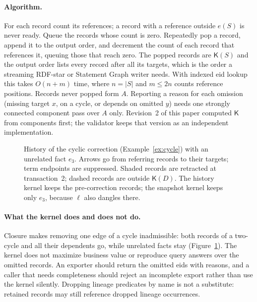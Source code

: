 \documentclass[11pt]{article}
\theoremstyle{plain}
\theoremstyle{definition}
\theoremstyle{remark}
\newcommand{\Kernel}{\mathsf{K}}
\begin{document}
\paragraph{Algorithm.}
For each record count its references; a record with a reference outside $e(S)$ is
never ready. Queue the records whose count is zero. Repeatedly pop a record, append
it to the output order, and decrement the count of each record that references it,
queuing those that reach zero. The popped records are $\Kernel(S)$ and the output
order lists every record after all its targets, which is the order a streaming
RDF-star or Statement Graph writer needs. With indexed eid lookup this takes
$O(n+m)$ time, where $n=|S|$ and $m\le2n$ counts reference positions. Records never
popped form $A$. Reporting a reason for each omission (missing target $x$, on a
cycle, or depends on omitted $y$) needs one strongly connected component pass over
$A$ only. Revision~2 of this paper computed $\Kernel$ from components first; the
validator keeps that version as an independent implementation.

\begin{figure}[t]
\centering
{}
\caption{History of the cyclic correction (Example~\ref{ex:cycle}) with an
unrelated fact $e_3$. Arrows go from referring records to their targets; term
endpoints are suppressed. Shaded records are retracted at transaction~2; dashed
records are outside $\Kernel(D)$. The history kernel keeps the pre-correction
records; the snapshot kernel keeps only $e_3$, because $\ell$ also dangles there.}
\label{fig:kernel}
\end{figure}

\paragraph{What the kernel does and does not do.}
Closure makes removing one edge of a cycle inadmissible: both records of a
two-cycle and all their dependents go, while unrelated facts stay
(Figure~\ref{fig:kernel}). The kernel does not maximize business value or
reproduce query answers over the omitted records. An exporter should return the
omitted eids with reasons, and a caller that needs completeness should reject an
incomplete export rather than use the kernel silently. Dropping lineage predicates
by name is not a substitute: retained records may still reference dropped lineage
occurrences.
\end{document}
